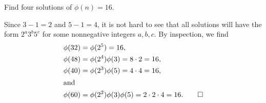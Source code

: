  Find four solutions of $\phi(n) = 16$.
\begin{solution}
  Since $3 - 1 = 2$ and $5 - 1 = 4$, it is not hard to see that all
  solutions will have the form $2^a3^b5^c$ for some nonnegative
  integers $a,b,c$. By inspection, we find
  \begin{align*}
    \phi(32) &= \phi(2^5) = 16, \\
    \phi(48) &= \phi(2^4)\phi(3) = 8\cdot2 = 16, \\
    \phi(40) &= \phi(2^3)\phi(5) = 4\cdot4 = 16, \\
    \intertext{and}
    \phi(60) &= \phi(2^2)\phi(3)\phi(5) = 2\cdot2\cdot4 = 16. \qedhere
  \end{align*}
\end{solution}
